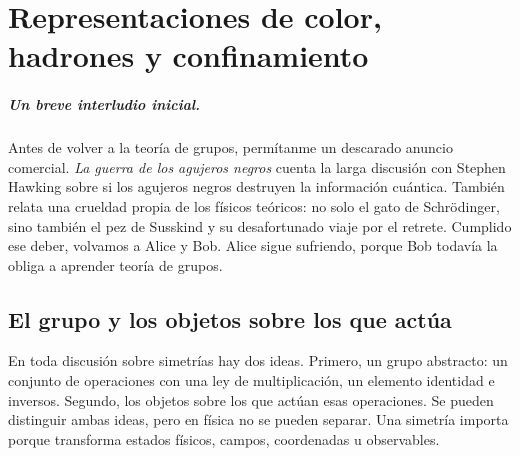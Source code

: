 \chapter{Representaciones de color, hadrones y confinamiento}

\paragraph{Un breve interludio inicial.}
Antes de volver a la teoría de grupos, permítanme un descarado anuncio comercial. \emph{La guerra de los agujeros negros} cuenta la larga discusión con Stephen Hawking sobre si los agujeros negros destruyen la información cuántica. También relata una crueldad propia de los físicos teóricos: no solo el gato de Schrödinger, sino también el pez de Susskind y su desafortunado viaje por el retrete. Cumplido ese deber, volvamos a Alice y Bob. Alice sigue sufriendo, porque Bob todavía la obliga a aprender teoría de grupos.


\section{El grupo y los objetos sobre los que actúa}

En toda discusión sobre simetrías hay dos ideas. Primero, un grupo abstracto: un conjunto de operaciones con una ley de multiplicación, un elemento identidad e inversos. Segundo, los objetos sobre los que actúan esas operaciones. Se pueden distinguir ambas ideas, pero en física no se pueden separar. Una simetría importa porque transforma estados físicos, campos, coordenadas u observables.

\begin{classroomqa}
\end{classroomqa}

